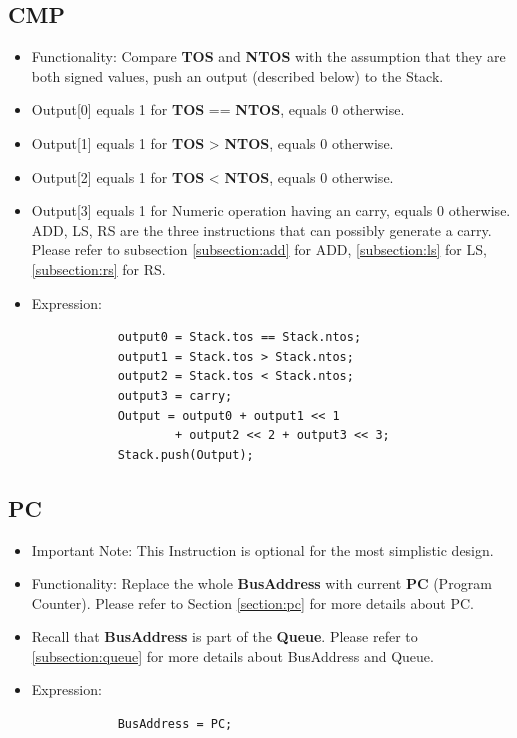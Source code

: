 \documentclass[11pt]{report}
\begin{document}
    \subsection{CMP}
    \label{subsection:cmp}
    \begin{itemize}
        \item Functionality: Compare \textbf{TOS} and \textbf{NTOS} with the assumption 
                that they are both signed values, push an output (described below) to the Stack.
        \item Output[0] equals 1 for \textbf{TOS} == \textbf{NTOS}, equals 0 otherwise.
        \item Output[1] equals 1 for \textbf{TOS} > \textbf{NTOS}, equals 0 otherwise.
        \item Output[2] equals 1 for \textbf{TOS} < \textbf{NTOS}, equals 0 otherwise.
        \item Output[3] equals 1 for Numeric operation having an carry, equals 0 otherwise.
                        ADD, LS, RS are the three instructions that can possibly generate a carry.
                        Please refer to subsection \ref{subsection:add} for ADD, \ref{subsection:ls} for LS, 
                        \ref{subsection:rs} for RS.
        \item Expression:
        \begin{verbatim}
            output0 = Stack.tos == Stack.ntos;
            output1 = Stack.tos > Stack.ntos;
            output2 = Stack.tos < Stack.ntos;
            output3 = carry;
            Output = output0 + output1 << 1 
                    + output2 << 2 + output3 << 3;
            Stack.push(Output);
        \end{verbatim}
    \end{itemize}

    \subsection{PC}
    \begin{itemize}
        \item Important Note: This Instruction is optional for the most simplistic design.
        \item Functionality: Replace the whole \textbf{BusAddress} with current \textbf{PC} (Program Counter). 
                Please refer to Section \ref{section:pc} for more details about PC.
        \item Recall that \textbf{BusAddress} is part of the \textbf{Queue}. Please refer to \ref{subsection:queue}
                for more details about BusAddress and Queue.
        \item Expression:
        \begin{verbatim}
            BusAddress = PC;
        \end{verbatim}
    \end{itemize}
\end{document}
